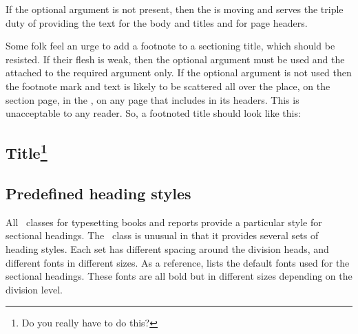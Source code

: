     If the optional argument is not present, then the  is
moving and serves the triple duty of providing the text for the body and \toc{}
titles and for page headers.

    Some folk feel an urge to add a footnote to a sectioning
title, which
should be resisted. If their flesh is weak, then the optional argument must
be used and the \cmd{\footnote} attached to the required argument only.
If the optional argument is not used then the footnote mark and text is
likely to be scattered all over the place, on the section page, in the \toc,
on any page that includes  in its headers. This is
unacceptable to any reader. So, a footnoted title should look like
this:
\begin{lcode}
\chapter[Title]{Title\footnote{Do you really have to do this?}}
\end{lcode}



\section{Predefined heading styles}

   All \ltx\ classes for typesetting books and reports provide a particular
style for sectional headings. The \Mname\ class is unusual in that it provides
several sets of heading styles. Each set has different spacing around the
division heads, and different fonts in different sizes.
    As a reference,  lists the default fonts used
for the sectional headings. These fonts are all bold but in different
sizes depending on the division level.


